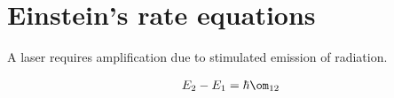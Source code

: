 \documentclass[a4paper, 11pt, normalem]{report}
\begin{document}
\chapter{Einstein's rate equations}
A laser requires amplification due to stimulated emission of radiation. 
\begin{multicols}{2}
\begin{figure}[H]
    \centering
\end{figure}
\begin{align}
    E_2 - E_1 = \hbar\om_{12}
\end{align}
\end{multicols}
\end{document}

